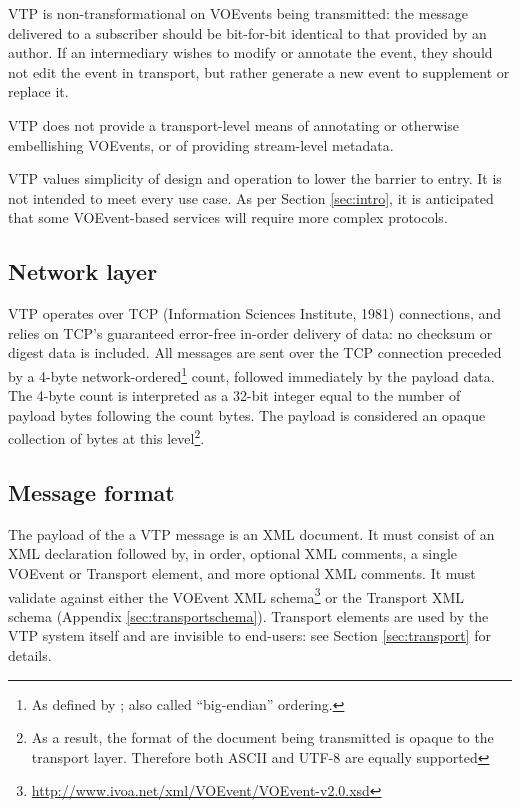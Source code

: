 \documentclass[a4paper,11pt]{ivoa}
\begin{document}
VTP is non-transformational on VOEvents being transmitted: the message
delivered to a subscriber should be bit-for-bit identical to that provided by
an author. If an intermediary wishes to modify or annotate the event, they
should not edit the event in transport, but rather generate a new event to
supplement or replace it.

VTP does not provide a transport-level means of annotating or otherwise
embellishing VOEvents, or of providing stream-level metadata.

VTP values simplicity of design and operation to lower the barrier to entry. It
is not intended to meet every use case. As per Section \ref{sec:intro}, it is
anticipated that some VOEvent-based services will require more complex
protocols.

\subsection{Network layer}

VTP operates over TCP (Information Sciences Institute, 1981) connections, and
relies on TCP's guaranteed error-free in-order delivery of data: no checksum
or digest data is included. All messages are sent over the TCP connection
preceded by a 4-byte network-ordered\footnote{As defined by
\citet{Reynolds:1994}; also called ``big-endian'' ordering.} count, followed
immediately by the payload data. The 4-byte count is interpreted as a 32-bit
integer equal to the number of payload bytes following the count bytes. The
payload is considered an opaque collection of bytes at this level\footnote{As
a result, the format of the document being transmitted is opaque to the
transport layer. Therefore both ASCII and UTF-8 are equally supported}.

\subsection{Message format}

The payload of the a VTP message is an XML document. It must consist of an XML
declaration followed by, in order, optional XML comments, a single VOEvent or
Transport element, and more optional XML comments. It must validate against
either the VOEvent XML
schema\footnote{\url{http://www.ivoa.net/xml/VOEvent/VOEvent-v2.0.xsd}} or the
Transport XML schema (Appendix \ref{sec:transportschema}). Transport elements
are used by the VTP system itself and are invisible to end-users: see Section
\ref{sec:transport} for details.
\end{document}
